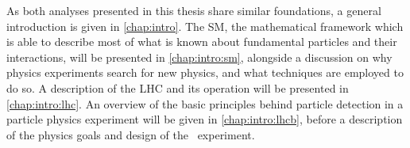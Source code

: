 As both analyses presented in this thesis share similar foundations, a general 
introduction is given in \cref{chap:intro}.
The \acl{SM}, the mathematical framework which is able to describe most of what 
is known about fundamental particles and their interactions, will be presented 
in \cref{chap:intro:sm}, alongside a discussion on why physics experiments 
search for new physics, and what techniques are employed to do so.
A description of the \acl{LHC} and its operation will be presented in 
\cref{chap:intro:lhc}.
An overview of the basic principles behind particle detection in a particle 
physics experiment will be given in \cref{chap:intro:lhcb}, before a 
description of the physics goals and design of the \lhcb\ experiment.
